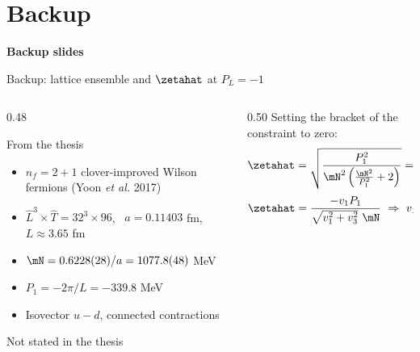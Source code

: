 \section*{Backup}

\begin{frame}
  \centering \Huge \textbf{Backup slides}
\end{frame}

\begin{frame}{Backup: lattice ensemble and $\zetahat$ at $P_L=-1$}
  \begin{columns}[t]
    \begin{column}{0.48\textwidth}
      \begin{block}{From the thesis}
        \begin{itemize}
          \item $n_f=2+1$ clover-improved Wilson fermions (Yoon \emph{et al.} 2017)
          \item $\hat L^3\times\hat T = 32^3\times 96$, \ $a=0.11403$ fm, \ $L\approx3.65$ fm
          \item $\mN = 0.6228(28)/a = 1077.8(48)$ MeV
          \item $P_1=-2\pi/L=-339.8$ MeV
          \item Isovector $u-d$, connected contractions
        \end{itemize}
      \end{block}
      \begin{alertblock}{Not stated in the thesis}
      \end{alertblock}
    \end{column}
    \begin{column}{0.50\textwidth}
      Setting the bracket of the constraint to zero:
      \[ \zetahat =\sqrt{\frac{P_{1}^2}{\mN^{2}\left(\frac{\mN^{2}}{P_{1}^{2}}+2\right)}} = \pm 0.090772 \]
      \[ \zetahat=\frac{-v_{1}P_{1}}{\sqrt{v_{1}^{2}+v_{3}^{2}}\ \mN} \ \Rightarrow\ v_{1}=\pm 0.301\,v_{3} \]
    \end{column}
  \end{columns}
\end{frame}

